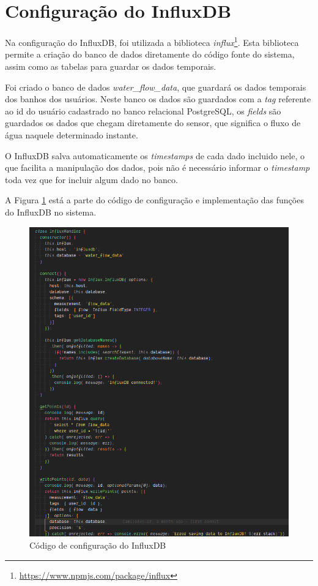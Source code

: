 \section{Configuração do InfluxDB}

Na configuração do InfluxDB, foi utilizada a biblioteca \textit{influx}\footnote{\url{https://www.npmjs.com/package/influx}}. Esta biblioteca permite a criação do banco de dados diretamente do código fonte do sistema, assim como as tabelas para guardar os dados temporais.

Foi criado o banco de dados \textit{water\_flow\_data}, que guardará os dados temporais dos banhos dos usuários. Neste banco os dados são guardados com a \textit{tag} referente ao id do usuário cadastrado no banco relacional PostgreSQL, os \textit{fields} são guardados os dados que chegam diretamente do sensor, que significa o fluxo de água naquele determinado instante.

O InfluxDB salva automaticamente os \textit{timestamps} de cada dado incluido nele, o que facilita a manipulação dos dados, pois não é necessário informar o \textit{timestamp} toda vez que for incluir algum dado no banco.

A Figura \ref{fig:influxconf} está a parte do código de configuração e implementação das funções do InfluxDB no sistema.

\begin{figure}[htbp]
	\centering
	\includegraphics[width=1\linewidth]{figuras/influxconf.png}
	\caption{Código de configuração do InfluxDB}
	\label{fig:influxconf}
\end{figure}

